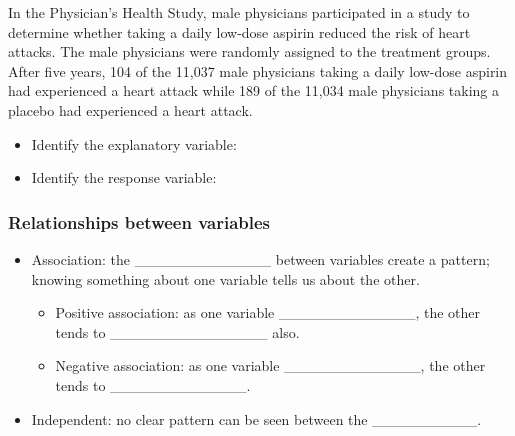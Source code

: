 \documentclass[
]{report}
\providecommand{\tightlist}{%
  \setlength{\itemsep}{0pt}\setlength{\parskip}{0pt}}
\begin{document}
\vspace{0.3in}

In the Physician's Health Study, male physicians participated in a study to determine whether taking a daily low-dose aspirin reduced the risk of heart attacks. The male physicians were randomly assigned to the treatment groups. After five years, 104 of the 11,037 male physicians taking a daily low-dose aspirin had experienced a heart attack while 189 of the 11,034 male physicians taking a placebo had experienced a heart attack.

\begin{itemize}
\tightlist
\item
  Identify the explanatory variable:
\end{itemize}

\vspace{0.3in}

\begin{itemize}
\tightlist
\item
  Identify the response variable:
\end{itemize}

\vspace{0.3in}

\hypertarget{relationships-between-variables}{%
\subsubsection*{Relationships between variables}\label{relationships-between-variables}}


\begin{itemize}
\item
  Association: the \_\_\_\_\_\_\_\_\_\_\_\_\_ between variables create a pattern; knowing something about one variable tells us about the other.

  \begin{itemize}
  \item
    Positive association: as one variable \_\_\_\_\_\_\_\_\_\_\_\_\_, the other tends to \_\_\_\_\_\_\_\_\_\_\_\_\_\_\_ also.
  \item
    Negative association: as one variable \_\_\_\_\_\_\_\_\_\_\_\_\_, the other tends to \_\_\_\_\_\_\_\_\_\_\_\_\_.
  \end{itemize}
\item
  Independent: no clear pattern can be seen between the \_\_\_\_\_\_\_\_\_\_.
\end{itemize}
\end{document}
